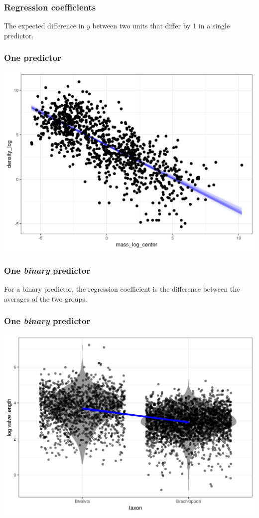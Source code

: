 \documentclass{beamer}
\begin{document}
\begin{frame}
  \frametitle{Regression coefficients}

  \begin{Large}
    The expected difference in \(y\) between two units that differ by 1 in a single predictor.
  \end{Large}
\end{frame}


\begin{frame}
  \frametitle{One predictor}
  \includegraphics[width=\textwidth,height=0.8\textheight,keepaspectratio=true]{predictor_fitted-1}
\end{frame}


\begin{frame}
  \frametitle{One \textit{binary} predictor}

  For a binary predictor, the regression coefficient is the difference between the averages of the two groups.

\end{frame}

\begin{frame}
  \frametitle{One \textit{binary} predictor}
  \includegraphics[width=\textwidth,height=0.8\textheight,keepaspectratio=true]{vis_linear_predictor_uncertainty-1}
\end{frame}
\end{document}
